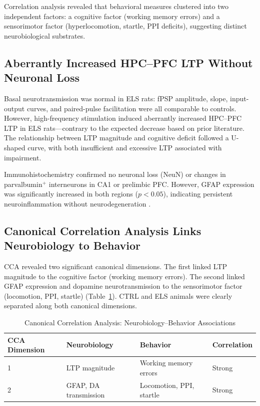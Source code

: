 \documentclass[11pt]{article}
\begin{document}
Correlation analysis revealed that behavioral measures clustered into two independent factors: a cognitive factor (working memory errors) and a sensorimotor factor (hyperlocomotion, startle, PPI deficits), suggesting distinct neurobiological substrates.

\subsection{Aberrantly Increased HPC--PFC LTP Without Neuronal Loss}

Basal neurotransmission was normal in ELS rats: fPSP amplitude, slope, input-output curves, and paired-pulse facilitation were all comparable to controls. However, high-frequency stimulation induced aberrantly increased HPC--PFC LTP in ELS rats---contrary to the expected decrease based on prior literature. The relationship between LTP magnitude and cognitive deficit followed a U-shaped curve, with both insufficient and excessive LTP associated with impairment.

Immunohistochemistry confirmed no neuronal loss (NeuN) or changes in parvalbumin$^+$ interneurons in CA1 or prelimbic PFC. However, GFAP expression was significantly increased in both regions ($p < 0.05$), indicating persistent neuroinflammation without neurodegeneration \citep{felger2019role}.

\subsection{Canonical Correlation Analysis Links Neurobiology to Behavior}

CCA revealed two significant canonical dimensions. The first linked LTP magnitude to the cognitive factor (working memory errors). The second linked GFAP expression and dopamine neurotransmission to the sensorimotor factor (locomotion, PPI, startle) (Table~\ref{tab:cca}). CTRL and ELS animals were clearly separated along both canonical dimensions.

\begin{table}[ht]
\centering
\caption{Canonical Correlation Analysis: Neurobiology--Behavior Associations}
\label{tab:cca}
\begin{tabular}{llll}
\toprule
\textbf{CCA Dimension} & \textbf{Neurobiology} & \textbf{Behavior} & \textbf{Correlation} \\
\midrule
1 & LTP magnitude & Working memory errors & Strong \\
2 & GFAP, DA transmission & Locomotion, PPI, startle & Strong \\
\bottomrule
\end{tabular}
\end{table}
\end{document}
